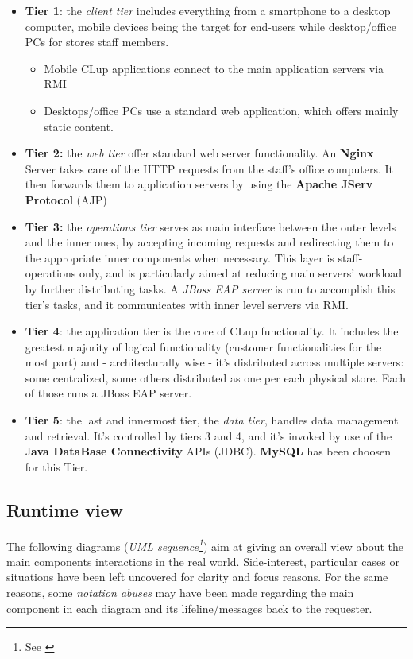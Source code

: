 \begin{itemize}
    \item \textbf{Tier 1}: the \textit{client tier} includes everything from a smartphone to a desktop computer, mobile devices being the target for end-users while desktop/office PCs for stores staff members. 
    \begin{itemize}
        \item Mobile CLup applications connect to the main application servers via RMI
        \item Desktops/office PCs use a standard web application, which offers mainly static content.
    \end{itemize}
    \item \textbf{Tier 2:} the \textit{web tier} offer standard web server functionality. An \textbf{Nginx} Server takes care of the HTTP requests from the staff's office computers. It then forwards them to application servers by using the \textbf{Apache JServ Protocol} (AJP)
    \item \textbf{Tier 3:} the \textit{operations tier} serves as main interface between the outer levels and the inner ones, by accepting incoming requests and redirecting them to the appropriate inner components when necessary. This layer is staff-operations only, and is particularly aimed at reducing main servers' workload by further distributing tasks. A \textit{JBoss EAP server} is run to accomplish this tier's tasks, and it communicates with inner level servers via RMI.
    \item \textbf{Tier 4}: the application tier is the core of CLup functionality. It includes the greatest majority of logical functionality (customer functionalities for the most part) and - architecturally wise - it's distributed across multiple servers: some centralized, some others distributed as one per each physical store. Each of those runs a JBoss EAP server. 
    \item \textbf{Tier 5}: the last and innermost tier, the \textit{data tier}, handles data management and retrieval. It's controlled by tiers 3 and 4, and it's invoked by use of the J\textbf{ava DataBase Connectivity} APIs (JDBC). \textbf{MySQL} has been choosen for this Tier.

\end{itemize}

\subsection{Runtime view}
The following diagrams (\textit{UML sequence\footnote{See \cite{UML:ref}}}) aim at giving an overall view about the main components interactions in the real world. Side-interest, particular cases or situations have been left uncovered for clarity and focus reasons. For the same reasons, some \textit{notation abuses} may have been made regarding the main component in each diagram and its lifeline/messages back to the requester.\newline



